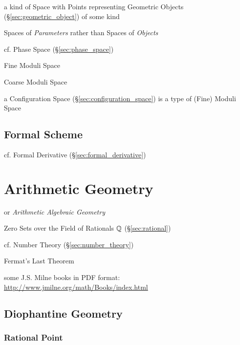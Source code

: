 a kind of Space with Points representing Geometric Objects
(\S\ref{sec:geometric_object}) of some kind

Spaces of \emph{Parameters} rather than Spaces of \emph{Objects}

cf. Phase Space (\S\ref{sec:phase_space})

Fine Moduli Space

Coarse Moduli Space

a Configuration Space (\S\ref{sec:configuration_space}) is a type of (Fine)
Moduli Space



\subsection{Formal Scheme}\label{sec:formal_scheme}

cf. Formal Derivative (\S\ref{sec:formal_derivative})



\section{Arithmetic Geometry}\label{sec:arithmetic_geometry}

or \emph{Arithmetic Algebraic Geometry}

Zero Sets over the Field of Rationals $\mathbb{Q}$ (\S\ref{sec:rational})

cf. Number Theory (\S\ref{sec:number_theory})

Fermat's Last Theorem

some J.S. Milne books in PDF format:
\url{http://www.jmilne.org/math/Books/index.html}



\subsection{Diophantine Geometry}\label{sec:diophantine_geometry}

\subsubsection{Rational Point}\label{sec:rational_point}

